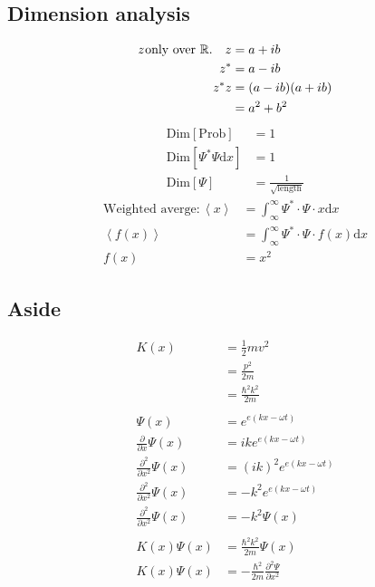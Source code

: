 \documentclass[11pt]{article}
\begin{document}
\subsection{Dimension analysis}
\label{sec:orgac603e5}
\begin{align*}
z^{\*} \text{only over } \mathbb{R}. \quad
z &= a + ib \\
z^{*} &= a - ib \\
z^{*} z &= (a - ib) ( a + ib) \\
  &= a^2 + b^2
\end{align*}
\begin{align*}
\mathrm{Dim}[\mathrm{Prob}] &= 1 \\
\mathrm{Dim}[\Psi^{*}\Psi \mathrm{d}x ] &= 1 \\
\mathrm{Dim}[\Psi] &= \frac{1}{\sqrt{\mathrm{length}}}
\end{align*}
\begin{align*}
\text{Weighted averge}: 
\left<  x \right> &= \int^{\infty}_{\infty} \Psi^{*} \cdot \Psi \cdot x \mathrm{d}x \\
\left< f(x) \right> &= \int^{\infty}_{\infty} \Psi^{*} \cdot \Psi \cdot f(x) \mathrm{d}x \\
f(x) &= x^2
\end{align*}
\subsection{Aside}
\label{sec:org1c9b492}
\begin{align*}
K(x) &= \frac{1}{2} mv^2 \\
  &= \frac{p^2}{2m} \\
  &= \frac{\hbar^2k^2}{2m} \\ \\
\Psi(x) &= e^{e(kx - \omega t)} \\
\frac{\partial}{\partial x}\Psi(x) &= ike^{e(kx - \omega t)} \\
\frac{\partial^2}{\partial x^2}\Psi(x) &= (ik)^2 e^{e(kx - \omega t)} \\
\frac{\partial^2}{\partial x^2}\Psi(x) &= - k^2 e^{e(kx - \omega t)} \\
\frac{\partial^2}{\partial x^2}\Psi(x) &= - k^2 \Psi(x) \\ \\
K(x) \Psi(x) &= \frac{\hbar^2k^2}{2m} \Psi(x) \\
K(x) \Psi(x) &= -\frac{\hbar^2}{2m} \frac{\partial^2 \Psi}{\partial x^2} \\
\end{align*}
\end{document}
